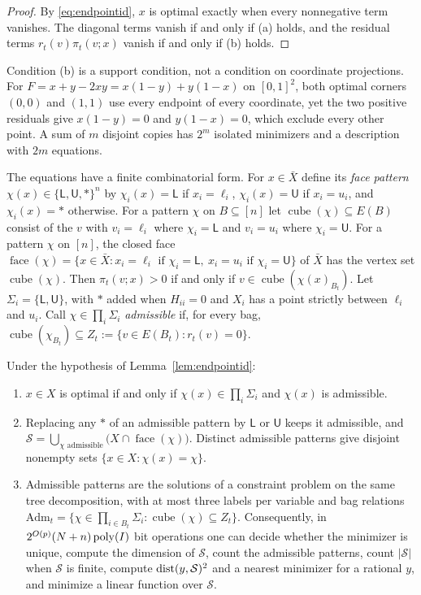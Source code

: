 \begin{proof}
By \eqref{eq:endpointid}, $x$ is optimal exactly when every nonnegative term
vanishes. The diagonal terms vanish if and only if (a) holds, and the
residual terms $r_t(v)\pi_t(v;x)$ vanish if and only if (b) holds.
\end{proof}

Condition (b) is a support condition, not a condition on coordinate
projections. For $F=x+y-2xy=x(1-y)+y(1-x)$ on $[0,1]^2$, both optimal
corners $(0,0)$ and $(1,1)$ use every endpoint of every coordinate, yet the
two positive residuals give $x(1-y)=0$ and $y(1-x)=0$, which exclude every
other point. A sum of $m$ disjoint copies has $2^m$ isolated minimizers and
a description with $2m$ equations.

The equations have a finite combinatorial form. For $x\in\bar X$ define its
\emph{face pattern} $\chi(x)\in\{\mathsf L,\mathsf U,\ast\}^n$ by
$\chi_i(x)=\mathsf L$ if $x_i=\ell_i$, $\chi_i(x)=\mathsf U$ if $x_i=u_i$, and
$\chi_i(x)=\ast$ otherwise. For a pattern $\chi$ on $B\subseteq[n]$ let
$\operatorname{cube}(\chi)\subseteq E(B)$ consist of the $v$ with $v_i=\ell_i$
where $\chi_i=\mathsf L$ and $v_i=u_i$ where $\chi_i=\mathsf U$. For a
pattern $\chi$ on $[n]$, the closed face
$\operatorname{face}(\chi)=\{x\in\bar X:x_i=\ell_i\text{ if }\chi_i=\mathsf L,\
x_i=u_i\text{ if }\chi_i=\mathsf U\}$ of $\bar X$ has the vertex set
$\operatorname{cube}(\chi)$. Then $\pi_t(v;x)>0$ if and only if
$v\in\operatorname{cube}(\chi(x)_{B_t})$. Let $\Sigma_i=\{\mathsf L,\mathsf U\}$,
with $\ast$ added when $H_{ii}=0$ and $X_i$ has a point strictly between
$\ell_i$ and $u_i$. Call $\chi\in\prod_i\Sigma_i$ \emph{admissible} if, for
every bag, $\operatorname{cube}(\chi_{B_t})\subseteq Z_t:=\{v\in E(B_t):r_t(v)=0\}$.

\begin{corollary}\label{cor:facecsp}
Under the hypothesis of Lemma~\ref{lem:endpointid}:
\begin{enumerate}
\item[(i)] $x\in X$ is optimal if and only if $\chi(x)\in\prod_i\Sigma_i$
and $\chi(x)$ is admissible.
\item[(ii)] Replacing any $\ast$ of an admissible pattern by $\mathsf L$ or
$\mathsf U$ keeps it admissible, and
$\mathcal S=\bigcup_{\chi\text{ admissible}}\bigl(X\cap\operatorname{face}(\chi)\bigr)$.
Distinct admissible patterns give disjoint nonempty sets
$\{x\in X:\chi(x)=\chi\}$.
\item[(iii)] Admissible patterns are the solutions of a constraint problem on
the same tree decomposition, with at most three labels per variable and bag
relations
$\mathrm{Adm}_t=\{\chi\in\prod_{i\in B_t}\Sigma_i:\operatorname{cube}(\chi)
\subseteq Z_t\}$. Consequently, in $2^{O(p)}(N+n)\operatorname{poly}(I)$ bit operations
one can decide whether the minimizer is unique, compute the dimension of
$\mathcal S$, count the admissible patterns, count $|\mathcal S|$ when
$\mathcal S$ is finite, compute $\operatorname{dist}(y,\mathcal S)^2$ and a nearest
minimizer for a rational $y$, and minimize a linear function over
$\mathcal S$.
\end{enumerate}
\end{corollary}

